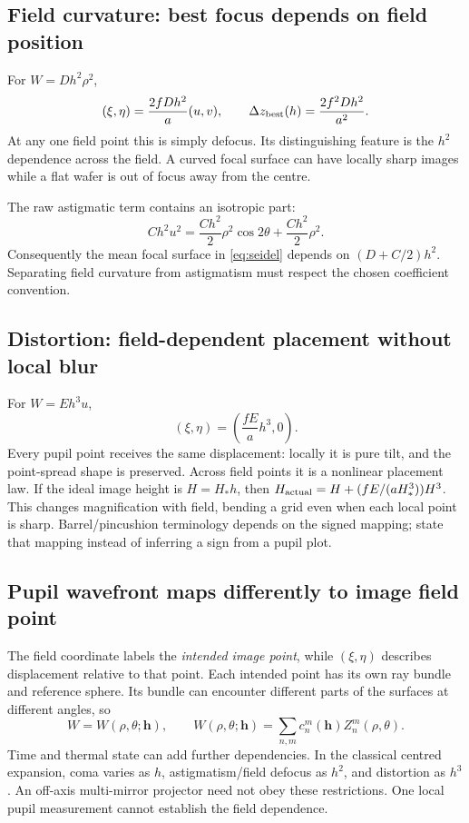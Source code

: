 \subsection{Field curvature: best focus depends on field position}
For $W=Dh^2\rho^2$,
\begin{equation}
(\xi,\eta)=\frac{2fDh^2}{a}(u,v),\qquad
\Delta z_{\rm best}(h)=\frac{2f^2Dh^2}{a^2}.
\end{equation}
At any one field point this is simply defocus. Its distinguishing feature is the $h^2$ dependence across the field. A curved focal surface can have locally sharp images while a flat wafer is out of focus away from the centre.

The raw astigmatic term contains an isotropic part:
\begin{equation}
Ch^2u^2=\frac{Ch^2}{2}\rho^2\cos2\theta+\frac{Ch^2}{2}\rho^2.
\end{equation}
Consequently the mean focal surface in \eqref{eq:seidel} depends on $(D+C/2)h^2$. Separating field curvature from astigmatism must respect the chosen coefficient convention.

\subsection{Distortion: field-dependent placement without local blur}
For $W=Eh^3u$,
\begin{equation}
\boxed{(\xi,\eta)=\left(\frac{fE}{a}h^3,0\right).}
\end{equation}
Every pupil point receives the same displacement: locally it is pure tilt, and the point-spread shape is preserved. Across field points it is a nonlinear placement law. If the ideal image height is $H=H_*h$, then
$H_{\rm actual}=H+(fE/(aH_*^3))H^3$. This changes magnification with field, bending a grid even when each local point is sharp. Barrel/pincushion terminology depends on the signed mapping; state that mapping instead of inferring a sign from a pupil plot.

\subsection{Pupil wavefront maps differently to image field point}
The field coordinate labels the \emph{intended image point}, while $(\xi,\eta)$ describes displacement relative to that point. Each intended point has its own ray bundle and reference sphere. Its bundle can encounter different parts of the surfaces at different angles, so
\begin{equation}
W=W(\rho,\theta;\mathbf h),\qquad
W(\rho,\theta;\mathbf h)=\sum_{n,m}c_n^m(\mathbf h)Z_n^m(\rho,\theta).
\end{equation}
Time and thermal state can add further dependencies. In the classical centred expansion, coma varies as $h$, astigmatism/field defocus as $h^2$, and distortion as $h^3$. An off-axis multi-mirror projector need not obey these restrictions. One local pupil measurement cannot establish the field dependence.

